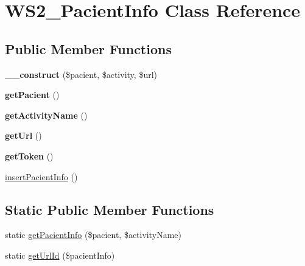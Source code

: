 \hypertarget{class_w_s2___pacient_info}{\section{W\+S2\+\_\+\+Pacient\+Info Class Reference}
\label{class_w_s2___pacient_info}
}
\subsection*{Public Member Functions}
\begin{DoxyCompactItemize}
\item 
\hypertarget{class_w_s2___pacient_info_ace1b038293256ce98dc046e3839d34d2}{{\bfseries \+\_\+\+\_\+construct} (\$pacient, \$activity, \$url)}\label{class_w_s2___pacient_info_ace1b038293256ce98dc046e3839d34d2}

\item 
\hypertarget{class_w_s2___pacient_info_ab285c759f6a4224312a1f1b12971f146}{{\bfseries get\+Pacient} ()}\label{class_w_s2___pacient_info_ab285c759f6a4224312a1f1b12971f146}

\item 
\hypertarget{class_w_s2___pacient_info_a9b566deb2ebd8bd785e67239540901f0}{{\bfseries get\+Activity\+Name} ()}\label{class_w_s2___pacient_info_a9b566deb2ebd8bd785e67239540901f0}

\item 
\hypertarget{class_w_s2___pacient_info_accd14bda49a1044b4d8dd93f020f11ee}{{\bfseries get\+Url} ()}\label{class_w_s2___pacient_info_accd14bda49a1044b4d8dd93f020f11ee}

\item 
\hypertarget{class_w_s2___pacient_info_a211a2979c22afcd7d9056a2bb55aa449}{{\bfseries get\+Token} ()}\label{class_w_s2___pacient_info_a211a2979c22afcd7d9056a2bb55aa449}

\item 
\hyperlink{class_w_s2___pacient_info_ac1456e33a827b3e52c2a783960f8fdd9}{insert\+Pacient\+Info} ()
\end{DoxyCompactItemize}
\subsection*{Static Public Member Functions}
\begin{DoxyCompactItemize}
\item 
static \hyperlink{class_w_s2___pacient_info_abf5833098432d4a2136d982a612308cc}{get\+Pacient\+Info} (\$pacient, \$activity\+Name)
\item 
static \hyperlink{class_w_s2___pacient_info_adf5a2a516e9b8c8cff86c005fe5bbb40}{get\+Url\+Id} (\$pacient\+Info)
\end{DoxyCompactItemize}



